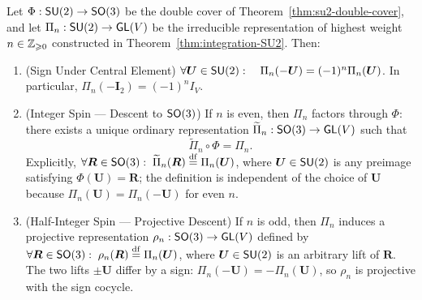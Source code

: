 \documentclass[11pt,reqno]{amsart}
\begin{document}
\begin{Prop}\label{prop:descent-criterion}
Let $\Phi:\operatorname{\mathsf{SU}}(2)\to\operatorname{\mathsf{SO}}(3)$ be the double cover of
Theorem~\ref{thm:su2-double-cover}, and let
$\Pi_n:\operatorname{\mathsf{SU}}(2)\to\operatorname{\mathsf{GL}}(V)$ be the irreducible representation of
highest weight $n\in\mathbb{Z}_{\geqslant 0}$ constructed in
Theorem~\ref{thm:integration-SU2}.
Then:
\begin{enumerate}
\item (Sign Under Central Element)
$\forall\bm U\in\operatorname{\mathsf{SU}}(2):\quad
\Pi_n(-\bm U)=(-1)^n\Pi_n(\bm U)$.
In particular,
$\Pi_n(-\bm I_2)=(-1)^n I_V$.
\item (Integer Spin — Descent to $\operatorname{\mathsf{SO}}(3)$)
If $n$ is even, then $\Pi_n$ factors through $\Phi$:
there exists a unique ordinary representation
$\widetilde{\Pi}_n:\operatorname{\mathsf{SO}}(3)\to\operatorname{\mathsf{GL}}(V)$ such that
\[
\widetilde{\Pi}_n\circ\Phi=\Pi_n.
\]
Explicitly,
$\forall\bm R\in\operatorname{\mathsf{SO}}(3):\;
\widetilde{\Pi}_n(\bm R)\stackrel{\mathrm{df}}{=}\Pi_n(\bm U)$,
where $\bm U\in\operatorname{\mathsf{SU}}(2)$ is any preimage satisfying
$\Phi(\bm U)=\bm R$; the definition is independent of the choice
of $\bm U$ because $\Pi_n(\bm U)=\Pi_n(-\bm U)$ for even $n$.
\item (Half-Integer Spin — Projective Descent)
If $n$ is odd, then $\Pi_n$ induces a projective representation
$\rho_n:\operatorname{\mathsf{SO}}(3)\to\operatorname{\mathsf{GL}}(V)$ defined by
$\forall\bm R\in\operatorname{\mathsf{SO}}(3):\;
\rho_n(\bm R)\stackrel{\mathrm{df}}{=}\Pi_n(\bm U)$,
where $\bm U\in\operatorname{\mathsf{SU}}(2)$ is an arbitrary lift of $\bm R$.
The two lifts $\pm\bm U$ differ by a sign:
$\Pi_n(-\bm U)=-\Pi_n(\bm U)$,
so $\rho_n$ is projective with the sign cocycle.
\end{enumerate}
\end{Prop}
\end{document}
